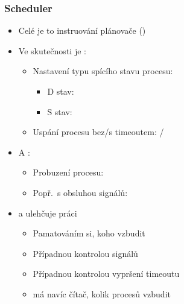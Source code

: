 \begin{frame}
  \frametitle{Scheduler}

  \begin{itemize}
    \item Celé je to instruování plánovače ()

    \item Ve skutečnosti je :
    \begin{itemize}
      \item Nastavení typu spícího stavu procesu: 
      \begin{itemize}
	\item D stav: 
	\item S stav: 
      \end{itemize}

      \pause

      \item Uspání procesu bez/s timeoutem:
        /
    \end{itemize}

    \pause
    
    \item A :
    \begin{itemize}
      \item Probuzení procesu: 
      \item Popř.\ s obsluhou signálů: 
    \end{itemize}

    \pause

    \item {} a  ulehčuje práci
    \begin{itemize}
      \item Pamatováním si, koho vzbudit
      \item Případnou kontrolou signálů
      \item Případnou kontrolou vypršení timeoutu
      \item {} má navíc čítač, kolik procesů vzbudit
    \end{itemize}
  \end{itemize}

\end{frame}

